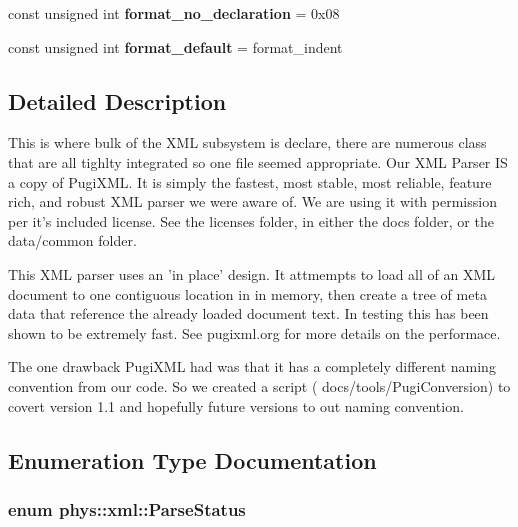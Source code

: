 \begin{DoxyCompactItemize}
\item 
\hypertarget{namespacephys_1_1xml_a6293fa2924378187e6f8e2d5d48a1079}{
const unsigned int {\bfseries format\_\-no\_\-declaration} = 0x08}
\label{d9/d27/namespacephys_1_1xml_a6293fa2924378187e6f8e2d5d48a1079}

\item 
\hypertarget{namespacephys_1_1xml_a0bad653e27a327962dc6df17757aeb1f}{
const unsigned int {\bfseries format\_\-default} = format\_\-indent}
\label{d9/d27/namespacephys_1_1xml_a0bad653e27a327962dc6df17757aeb1f}

\end{DoxyCompactItemize}


\subsection{Detailed Description}
This is where bulk of the XML subsystem is declare, there are numerous class that are all tighlty integrated so one file seemed appropriate. Our XML Parser IS a copy of PugiXML. It is simply the fastest, most stable, most reliable, feature rich, and robust XML parser we were aware of. We are using it with permission per it's included license. See the licenses folder, in either the docs folder, or the data/common folder. \par
 \par
 This XML parser uses an 'in place' design. It attmempts to load all of an XML document to one contiguous location in in memory, then create a tree of meta data that reference the already loaded document text. In testing this has been shown to be extremely fast. See pugixml.org for more details on the performace. \par
 \par
 The one drawback PugiXML had was that it has a completely different naming convention from our code. So we created a script ( docs/tools/PugiConversion) to covert version 1.1 and hopefully future versions to out naming convention. 

\subsection{Enumeration Type Documentation}
\hypertarget{namespacephys_1_1xml_ae7aabb879b21c73d8183a54470f8917f}{
\subsubsection[{ParseStatus}]{\setlength{\rightskip}{0pt plus 5cm}enum {\bf phys::xml::ParseStatus}}}
\label{d9/d27/namespacephys_1_1xml_ae7aabb879b21c73d8183a54470f8917f}


